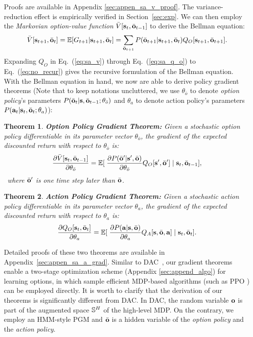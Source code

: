 \documentclass[10pt,journal,compsoc]{IEEEtran}
\renewcommand{\cite}{\citep}
\newtheorem{thm}{Theorem}[section]
\begin{document}
Proofs are available in Appendix \ref{sec:appen_sa_v_proof}. The
variance-reduction effect is empirically verified in
Section~\ref{sec:exp}. We can then employ the \emph{Markovian
  option-value function} $\bar{V}[{\mathbf{s}}_t,\bar{{\mathbf{o}}}_{t-1}]$ to
derive the Bellman equation:
\begin{equation}
  \label{eq:sa_v}
  \bar{V}[\rvs_{t+1},\bar{\rvo}_{t}]=\E[G_{t+1}|\rvs_{t+1},\bar{\rvo}_{t}]= \sum_{\bar{\rvo}_{t+1}}P(\bar{\rvo}_{t+1}|\rvs_{t+1},\bar{\rvo}_{t})Q_O[ \rvs_{t+1},\bar{\rvo}_{t+1}].
\end{equation}
Expanding $Q_O$ in Eq.~(\ref{eq:sa_v}) through Eq.~(\ref{eq:sa_q_o})
to Eq.~(\ref{eq:no_recur}) gives the recursive formulation of the
Bellman equation. With the Bellman equation in hand, we now are
able to derive policy gradient theorems (Note that to keep notations uncluttered, we use $\theta_{\bar{o}}$ to denote \emph{option policy}'s parameters
$P(\bar{{\mathbf{o}}}_{t}|{\mathbf{s}},\bar{{\mathbf{o}}}_{t-1};\theta_{\bar{o}})$ and $\theta_a$ to denote action policy's parameters
$P({\mathbf{a}}_t|{\mathbf{s}}_t,\bar{{\mathbf{o}}}_t;\theta_a)$):

\begin{thm}
  \textbf{ Option Policy Gradient Theorem: } Given a stochastic
  \emph{option policy} differentiable in its parameter vector
  $\theta_{\bar{o}}$, the gradient of the expected discounted
  return with respect to $\theta_{\bar{o}}$ is:
  \begin{equation}
    \label{eq:sa_o_grad}
    \frac{\partial \bar{V}[\rvs_t,\bar{\rvo}_{t-1}]}{\partial \theta_{\bar{o}}}=\E[\;\frac{\partial P(\bar{\rvo}'|\rvs',\bar{\rvo})}{\partial \theta_{\bar{o}}}Q_O[\rvs',\bar{\rvo}']\;|\;\rvs_t,\bar{\rvo}_{t-1}],
  \end{equation}
  ~where $\bar{{\mathbf{o}}}'$ is one time step later than $\bar{{\mathbf{o}}}$.
\end{thm}
\begin{thm}
  \textbf{ Action Policy Gradient Theorem: } Given a stochastic action policy
  differentiable in its parameter vector $\theta_a$, the gradient
  of the expected discounted return with respect to $\theta_a$ is:
  \begin{equation}
    \label{eq:sa_a_grad}
      \frac{\partial Q_O[\rvs_t,\bar{\rvo}_t]}{ \partial \theta_a }=\E[\;\frac{\partial P(\rva|\rvs,\bar{\rvo})}{\partial \theta_a}Q_A[ \rvs,\bar{\rvo},\rva]\; | \; \rvs_t,\bar{\rvo}_t].
  \end{equation}
\end{thm}
 Detailed proofs of these two theorems are available
in Appendix~\ref{sec:appen_sa_a_grad}. Similar to
DAC~\cite{zhang2019dac}, our gradient theorems enable a two-stage
optimization scheme (Appendix \ref{sec:append_algo}) for learning
options, in which sample efficient MDP-based algorithms (such as
PPO \cite{witoonchart2017application}) can be employed directly.
It is worth to clarify that the derivation of our theorems is
significantly different from DAC. In DAC, the random variable
${\mathbf{o}}$ is part of the augmented space ${\mathbb{S}}^H$ of the high-level
MDP. On the contrary, we employ an HMM-style PGM and $\bar{{\mathbf{o}}}$
is a hidden variable of the \emph{option policy} and the
\emph{action policy}.
\end{document}
